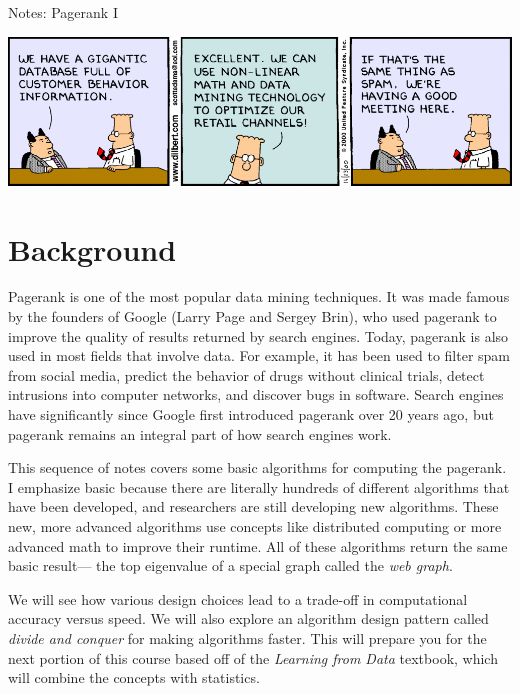 \documentclass[10pt]{article}
\theoremstyle{definition}
\begin{document}
\begin{center}
{
\Huge
Notes: Pagerank I
}

\end{center}

\begin{center}
\includegraphics[width=\textwidth]{dilbert}
\end{center}

\section{Background}

Pagerank is one of the most popular data mining techniques.
It was made famous by the founders of Google (Larry Page and Sergey Brin),
who used pagerank to improve the quality of results returned by search engines.
Today, pagerank is also used in most fields that involve data.
For example, it has been used to filter spam from social media,
predict the behavior of drugs without clinical trials,
detect intrusions into computer networks,
and discover bugs in software.
Search engines have significantly since Google first introduced pagerank over 20 years ago,
but pagerank remains an integral part of how search engines work.

This sequence of notes covers some basic algorithms for computing the pagerank.
I emphasize basic because there are literally hundreds of different algorithms that have been developed,
and researchers are still developing new algorithms.
These new, more advanced algorithms use concepts like distributed computing or more advanced math to improve their runtime.
All of these algorithms return the same basic result---
the top eigenvalue of a special graph called the \emph{web graph}.

We will see how various design choices lead to a trade-off in computational accuracy versus speed.
We will also explore an algorithm design pattern called \emph{divide and conquer} for making algorithms faster.
This will prepare you for the next portion of this course based off of the \emph{Learning from Data} textbook,
which will combine the concepts with statistics.
\end{document}
